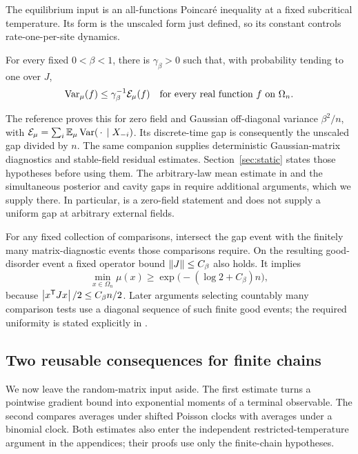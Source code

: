 The equilibrium input is an all-functions Poincar\'e inequality at a
fixed subcritical temperature.  Its form is the unscaled form just
defined, so its constant controls rate-one-per-site dynamics.

\begin{theorem}
\label{thm:input-gap}
For every fixed \(0<\beta<1\), there is \(\gamma_\beta>0\) such that,
with probability tending to one over \(J\),
\[
 \operatorname{Var}_\mu(f)\leq\gamma_\beta^{-1}\mathcal E_\mu(f)
 \quad\text{for every real function }f\text{ on }\Omega_n.
\]
\end{theorem}

The reference proves this for zero field and Gaussian off-diagonal
variance \(\beta^2/n\), with
\(\mathcal E_\mu=\sum_i\mathbb E_\mu\operatorname{Var}(\,\cdot\,\mid X_{-i})\).
Its discrete-time gap is consequently the unscaled gap divided by \(n\).
The same companion supplies deterministic Gaussian-matrix diagnostics
and stable-field residual estimates.  Section~\ref{sec:static} states
those hypotheses before using them.  The arbitrary-law mean estimate in
 and the simultaneous posterior and cavity gaps in
 require additional arguments, which we
supply there.  In particular,  is a zero-field
statement and does not supply a uniform gap at arbitrary external fields.

For any fixed collection of comparisons, intersect the gap event with
the finitely many matrix-diagnostic events those comparisons require.
On the resulting good-disorder event a fixed operator bound
\(\left\lVert J\right\rVert\leq C_\beta\) also holds.
It implies
\begin{equation}
 \min_{x\in\Omega_n}\mu(x)\geq
 \exp\bigl(-(\log2+C_\beta)n\bigr),
 \label{eq:model-minmass}
\end{equation}
because \(\left\lvert x^{\mathsf T}Jx\right\rvert/2\leq C_\beta n/2\).
Later arguments selecting countably many comparison tests use a
diagonal sequence of such finite good events; the required
uniformity is stated explicitly in .

\subsection{Two reusable consequences for finite chains}

We now leave the random-matrix input aside.  The first estimate turns a
pointwise gradient bound into exponential moments of a terminal observable.
The second compares averages under shifted Poisson clocks with averages
under a binomial clock.  Both estimates also enter the independent restricted-temperature argument
in the appendices; their proofs use only the finite-chain hypotheses.

